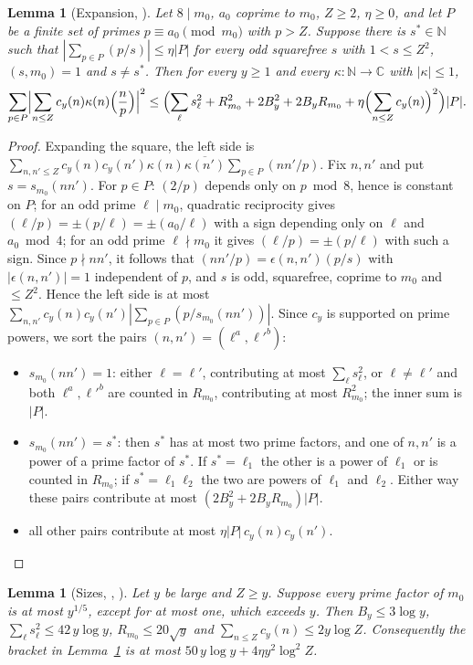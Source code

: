 \documentclass[11pt]{amsart}
\newcommand{\CC}{\mathbb{C}}
\newcommand{\N}{\mathbb{N}}
\theoremstyle{plain}
\newtheorem{lemma}[theorem]{Lemma}
\theoremstyle{definition}
\numberwithin{equation}{section}
\begin{document}
\begin{lemma}[Expansion, ]\label{lem:msexpand}
Let $8\mid m_0$, $a_0$ coprime to $m_0$, $Z\ge2$, $\eta\ge0$, and let $P$ be a finite set of primes
$p\equiv a_0\pmod{m_0}$ with $p>Z$. Suppose there is $s^\ast\in\N$ such that
$|\sum_{p\in P}(p/s)|\le\eta|P|$ for every odd squarefree $s$ with $1<s\le Z^2$, $(s,m_0)=1$ and
$s\ne s^\ast$. Then for every $y\ge1$ and every $\kappa:\N\to\CC$ with $|\kappa|\le1$,
\[
\sum_{p\in P}\Bigl|\sum_{n\le Z}c_y(n)\kappa(n)\Bigl(\frac np\Bigr)\Bigr|^2\le
\Bigl(\sum_\ell s_\ell^2+R_{m_0}^2+2B_y^2+2B_yR_{m_0}+\eta\Bigl(\sum_{n\le Z}c_y(n)\Bigr)^2\Bigr)|P|.
\]
\end{lemma}

\begin{proof}
Expanding the square, the left side is
$\sum_{n,n'\le Z}c_y(n)c_y(n')\kappa(n)\overline{\kappa(n')}\sum_{p\in P}(nn'/p)$. Fix $n,n'$ and
put $s=s_{m_0}(nn')$. For $p\in P$: $(2/p)$ depends only on $p\bmod8$, hence is constant on $P$;
for an odd prime $\ell\mid m_0$, quadratic reciprocity gives $(\ell/p)=\pm(p/\ell)=\pm(a_0/\ell)$
with a sign depending only on $\ell$ and $a_0\bmod4$; for an odd prime $\ell\nmid m_0$ it gives
$(\ell/p)=\pm(p/\ell)$ with such a sign. Since $p\nmid nn'$, it follows that
$(nn'/p)=\epsilon(n,n')(p/s)$ with $|\epsilon(n,n')|=1$ independent of $p$, and $s$ is odd,
squarefree, coprime to $m_0$ and $\le Z^2$. Hence the left side is at most
$\sum_{n,n'}c_y(n)c_y(n')|\sum_{p\in P}(p/s_{m_0}(nn'))|$. Since $c_y$ is supported on prime
powers, we sort the pairs $(n,n')=(\ell^a,\ell'^b)$:
\begin{itemize}
\item $s_{m_0}(nn')=1$: either $\ell=\ell'$, contributing at most $\sum_\ell s_\ell^2$, or
  $\ell\neq\ell'$ and both $\ell^a,\ell'^b$ are counted in $R_{m_0}$, contributing at most
  $R_{m_0}^2$; the inner sum is $|P|$.
\item $s_{m_0}(nn')=s^\ast$: then $s^\ast$ has at most two prime factors, and one of $n,n'$ is a
  power of a prime factor of $s^\ast$. If $s^\ast=\ell_1$ the other is a power of $\ell_1$ or is
  counted in $R_{m_0}$; if $s^\ast=\ell_1\ell_2$ the two are powers of $\ell_1$ and $\ell_2$. Either
  way these pairs contribute at most $(2B_y^2+2B_yR_{m_0})|P|$.
\item all other pairs contribute at most $\eta|P|\,c_y(n)c_y(n')$.\qedhere
\end{itemize}
\end{proof}

\begin{lemma}[Sizes, , ]\label{lem:mssizes}
Let $y$ be large and $Z\ge y$. Suppose every prime factor of $m_0$ is at most $y^{1/5}$, except
for at most one, which exceeds $y$. Then $B_y\le3\log y$, $\sum_\ell s_\ell^2\le42\,y\log y$,
$R_{m_0}\le20\sqrt y$ and $\sum_{n\le Z}c_y(n)\le2y\log Z$. Consequently the bracket in
Lemma~\ref{lem:msexpand} is at most $50\,y\log y+4\eta y^2\log^2Z$.
\end{lemma}
\end{document}
